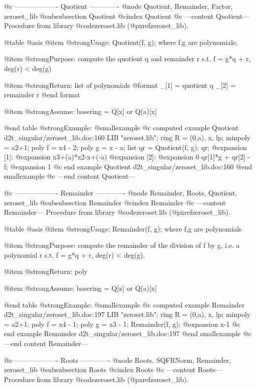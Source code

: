 @c ------------------- Quotient -------------
@node Quotient, Remainder, Factor, zeroset_lib
@subsubsection Quotient
@cindex Quotient
@c ---content Quotient---
Procedure from library @code{zeroset.lib} (@pxref{zeroset_lib}).

@table @asis
@item @strong{Usage:}
Quotient(f, g); where f,g are polynomials;

@item @strong{Purpose:}
compute the quotient q and remainder r s.t. f = g*q + r, deg(r) < deg(g)

@item @strong{Return:}
list of polynomials
  @format
  _[1] = quotient  q
  _[2] = remainder r
  @end format

@item @strong{Assume:}
basering = Q[x] or Q(a)[x]

@end table
@strong{Example:}
@smallexample
@c computed example Quotient d2t_singular/zeroset_lib.doc:160 
LIB "zeroset.lib";
ring R = (0,a), x, lp;
minpoly = a2+1;
poly f =  x4 - 2;
poly g = x - a;
list qr = Quotient(f, g);
qr;
@expansion{} [1]:
@expansion{}    x3+(a)*x2-x+(-a)
@expansion{} [2]:
@expansion{}    0
qr[1]*g + qr[2] - f;
@expansion{} 1
@c end example Quotient d2t_singular/zeroset_lib.doc:160
@end smallexample
@c ---end content Quotient---

@c ------------------- Remainder -------------
@node Remainder, Roots, Quotient, zeroset_lib
@subsubsection Remainder
@cindex Remainder
@c ---content Remainder---
Procedure from library @code{zeroset.lib} (@pxref{zeroset_lib}).

@table @asis
@item @strong{Usage:}
Remainder(f, g); where f,g are polynomials

@item @strong{Purpose:}
compute the remainder of the division of f by g, i.e. a polynomial r
s.t. f = g*q + r, deg(r) < deg(g).

@item @strong{Return:}
poly

@item @strong{Assume:}
basering = Q[x] or Q(a)[x]

@end table
@strong{Example:}
@smallexample
@c computed example Remainder d2t_singular/zeroset_lib.doc:197 
LIB "zeroset.lib";
ring R = (0,a), x, lp;
minpoly = a2+1;
poly f =  x4 - 1;
poly g = x3 - 1;
Remainder(f, g);
@expansion{} x-1
@c end example Remainder d2t_singular/zeroset_lib.doc:197
@end smallexample
@c ---end content Remainder---

@c ------------------- Roots -------------
@node Roots, SQFRNorm, Remainder, zeroset_lib
@subsubsection Roots
@cindex Roots
@c ---content Roots---
Procedure from library @code{zeroset.lib} (@pxref{zeroset_lib}).

